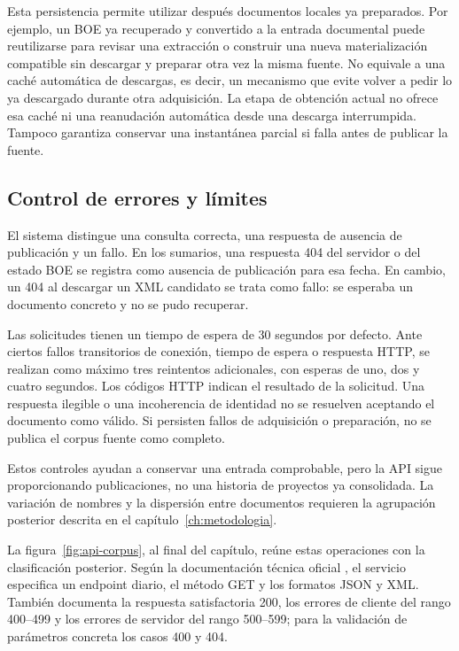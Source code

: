 Esta persistencia permite utilizar después documentos locales ya preparados.
Por ejemplo, un BOE ya recuperado y convertido a la entrada documental puede
reutilizarse para revisar una extracción o construir una nueva materialización
compatible sin descargar y preparar otra vez la misma fuente.
No equivale a una caché automática de descargas, es decir, un mecanismo que
evite volver a pedir lo ya descargado durante otra adquisición. La etapa de
obtención actual no ofrece esa caché ni una reanudación automática desde
una descarga interrumpida. Tampoco garantiza conservar una instantánea parcial
si falla antes de publicar la fuente.

\subsection{Control de errores y límites}
El sistema distingue una consulta correcta, una respuesta de ausencia de
publicación y un fallo. En los sumarios, una respuesta 404 del servidor o del
estado BOE se registra como ausencia de publicación para esa fecha. En cambio,
un 404 al descargar un XML candidato se trata como fallo: se esperaba un
documento concreto y no se pudo recuperar.

Las solicitudes tienen un tiempo de espera de 30 segundos por defecto.
Ante ciertos fallos transitorios de conexión, tiempo de espera o respuesta
HTTP, se realizan como máximo tres reintentos adicionales, con esperas de
uno, dos y cuatro segundos. Los códigos HTTP indican el resultado de la
solicitud. Una respuesta
ilegible o una incoherencia de identidad no se resuelven aceptando el documento
como válido. Si persisten fallos de adquisición o preparación, no se publica
el corpus fuente como completo.

Estos controles ayudan a conservar una entrada comprobable, pero la API sigue
proporcionando publicaciones, no una historia de proyectos ya consolidada.
La variación de nombres y la dispersión entre documentos requieren la
agrupación posterior descrita en el capítulo~\ref{ch:metodologia}.

La figura~\ref{fig:api-corpus}, al final del capítulo, reúne estas operaciones
con la clasificación posterior. Según la documentación técnica oficial
\cite{agenciaestatalboletínoficialdelestado_apiparaacceso_2024}, el servicio
especifica un endpoint diario, el método GET y los formatos JSON y XML. También
documenta la respuesta satisfactoria 200, los errores de cliente del rango
400--499 y los errores de servidor del rango 500--599; para la validación de
parámetros concreta los casos 400 y 404.

